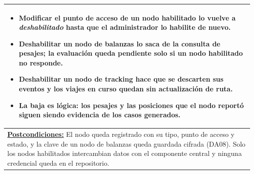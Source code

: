 \begin{table}[H]
\begin{tabular}{|p{15.8cm}|}
\begin{itemize}[leftmargin=*,topsep=2pt,itemsep=1pt,parsep=0pt,partopsep=0pt]
    \item Modificar el punto de acceso de un nodo habilitado lo vuelve a \emph{deshabilitado} hasta que el administrador lo habilite de nuevo.
    \item Deshabilitar un nodo de balanzas lo saca de la consulta de pesajes; la evaluación queda pendiente solo si un nodo habilitado no responde.
    \item Deshabilitar un nodo de tracking hace que se descarten sus eventos y los viajes en curso quedan sin actualización de ruta.
    \item La baja es lógica: los pesajes y las posiciones que el nodo reportó siguen siendo evidencia de los casos generados.
\end{itemize} \\ \hline
\textbf{\underline{Postcondiciones:}} El nodo queda registrado con su tipo, punto de acceso y estado, y la clave de un nodo de balanzas queda guardada cifrada (DA08). Solo los nodos habilitados intercambian datos con el componente central y ninguna credencial queda en el repositorio. \\ \hline
\end{tabular}
\end{table}
